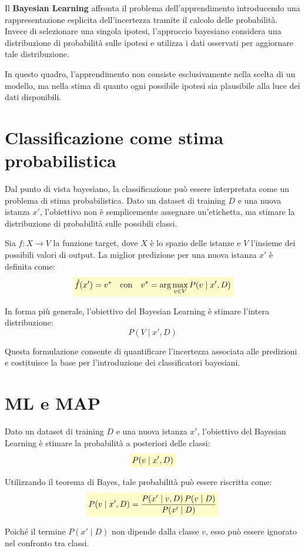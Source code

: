 \documentclass[a4paper,12pt]{report}
\newcommand{\highlight}[1]{%
\colorbox{yellow!20}{$\displaystyle #1$}%
}
\begin{document}
Il \textbf{Bayesian Learning} affronta il problema dell’apprendimento introducendo una rappresentazione esplicita dell’incertezza tramite il calcolo delle probabilità.
Invece di selezionare una singola ipotesi, l’approccio bayesiano considera una distribuzione di probabilità sulle ipotesi e utilizza i dati osservati per aggiornare tale distribuzione.

In questo quadro, l’apprendimento non consiste esclusivamente nella scelta di un modello, ma nella stima di quanto ogni possibile ipotesi sia plausibile alla luce dei dati disponibili.

\section{Classificazione come stima probabilistica}

Dal punto di vista bayesiano, la classificazione può essere interpretata come un problema di stima probabilistica.
Dato un dataset di training \( D \) e una nuova istanza \( x' \), l’obiettivo non è semplicemente assegnare un’etichetta, ma stimare la distribuzione di probabilità sulle possibili classi.

Sia \( f : X \rightarrow V \) la funzione target, dove \( X \) è lo spazio delle istanze e \( V \) l’insieme dei possibili valori di output.
La miglior predizione per una nuova istanza \( x' \) è definita come:
\[
\highlight{
\hat{f}(x') = v^*
\quad \text{con} \quad
v^* = \arg\max_{v \in V} P(v \mid x', D)}
\]

In forma più generale, l’obiettivo del Bayesian Learning è stimare l’intera distribuzione:
\[
P(V \mid x', D)
\]

Questa formulazione consente di quantificare l’incertezza associata alle predizioni e costituisce la base per l’introduzione dei classificatori bayesiani.

\section{ML e MAP}

Dato un dataset di training \( D \) e una nuova istanza \( x' \), l’obiettivo del Bayesian Learning è stimare la probabilità a posteriori delle classi:
\[
\highlight{
P(v \mid x', D)}
\]

Utilizzando il teorema di Bayes, tale probabilità può essere riscritta come:
\[
\highlight{
P(v \mid x', D) = \frac{P(x' \mid v, D)\, P(v \mid D)}{P(x' \mid D)}}
\]

Poiché il termine \( P(x' \mid D) \) non dipende dalla classe \( v \), esso può essere ignorato nel confronto tra classi.
\end{document}
